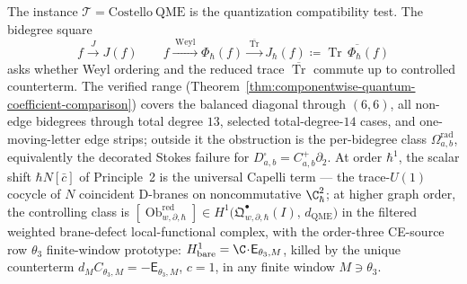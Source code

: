 The instance \(\mathcal T=\mathrm{Costello\ QME}\) is the
quantization compatibility test.  The bidegree square
\[
  f\xrightarrow{\;J\;}J(f)\qquad
  f\xrightarrow{\;\mathrm{Weyl}\;}\Phi_\hbar(f)
   \xrightarrow{\;\overline{\operatorname{Tr}}\;}
   J_\hbar(f)\coloneq\overline{\operatorname{Tr}\,\Phi_\hbar(f)}
\]
asks whether Weyl ordering and the reduced trace
\(\overline{\operatorname{Tr}}\) commute up to controlled
counterterm.  The verified range
(Theorem~\ref{thm:componentwise-quantum-coefficient-comparison})
covers the balanced diagonal through \((6,6)\), all non-edge
bidegrees through total degree \(13\), selected total-degree-\(14\)
cases, and one-moving-letter edge strips; outside it the obstruction
is the per-bidegree class \(\Omega^{\mathrm{rad}}_{a,b}\),
equivalently the decorated Stokes failure for
\(D^\square_{a,b}=C^+_{a,b}\partial_2\).  At order \(\hbar^1\), the
scalar shift \(\hbar N[\bar c]\) of Principle~2 is the universal
Capelli term --- the trace-\(U(1)\) cocycle of \(N\) coincident
D-branes on noncommutative \(\C^2_\hbar\); at higher graph order, the
controlling class is
\([\operatorname{Ob}^{\mathrm{red}}_{w,\partial,\hbar}]\in
H^1\bigl(\mathfrak Q^\bullet_{w,\partial,\hbar}(I),\,d_{\mathrm{QME}}\bigr)\)
in the filtered weighted brane-defect local-functional complex,
with the order-three CE-source row \(\theta_3\) finite-window
prototype:
\(H^1_{\mathrm{bare}}=\C\!\cdot\!\mathsf E_{\theta_3,M}\), killed by
the unique counterterm $d_M C_{\theta_3,M}=-\mathsf E_{\theta_3,M}$,
\(c=1\), in any finite window $M\ni\theta_3$.

